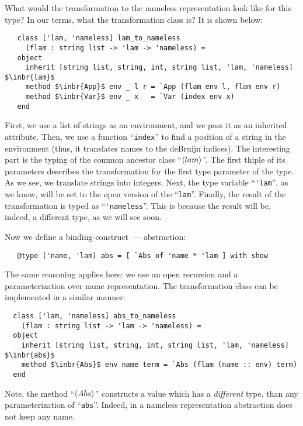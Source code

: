 What would the transformation to the nameless representation look like for this type? In our terms, what the transformation class is? It is shown
below:

\begin{lstlisting}
   class ['lam, 'nameless] lam_to_nameless
     (flam : string list -> 'lam -> 'nameless) =
   object
     inherit [string list, string, int, string list, 'lam, 'nameless] $\inbr{lam}$
     method $\inbr{App}$ env _ l r = `App (flam env l, flam env r)
     method $\inbr{Var}$ env _ x   = `Var (index env x)
   end
\end{lstlisting}

First, we use a list of strings as an environment, and we pass it as an inherited attribute. Then, we use a function ``\lstinline{index}'' to find a
position of a string in the environment (thus, it translates names to the deBruijn indices). The interesting part is the typing of the common ancestor
class ``$\left<lam\right>$''. The first thiple of its parameters describes the transformation for the first type parameter of the type. As we see, we
translate strings into integers. Next, the type variable ``\lstinline{'lam}'', as we know, will be set to the open version of the ``\lstinline{lam}''.
Finally, the result of the transformation is typed as ``\lstinline{'nameless}''. This is because the result will be, indeed, a different type, as we
will see soon.

Now we define a binding construct~--- abstraction:

\begin{lstlisting}
   @type ('name, 'lam) abs = [ `Abs of 'name * 'lam ] with show
\end{lstlisting}

The same reasoning applies here: we use an open recursion and a parameterization over name representation. The transformation class can be
implemented in a similar manner:

\begin{lstlisting}
  class ['lam, 'nameless] abs_to_nameless
    (flam : string list -> 'lam -> 'nameless) =
  object
    inherit [string list, string, int, string list, 'lam, 'nameless] $\inbr{abs}$
    method $\inbr{Abs}$ env name term = `Abs (flam (name :: env) term)
  end
\end{lstlisting}

Note, the method ``$\left<Abs\right>$'' constructs a value which has a \emph{different} type, than any parameterization of ``\lstinline{abs}''. Indeed, in a
nameless representation abstraction does not keep any name.


